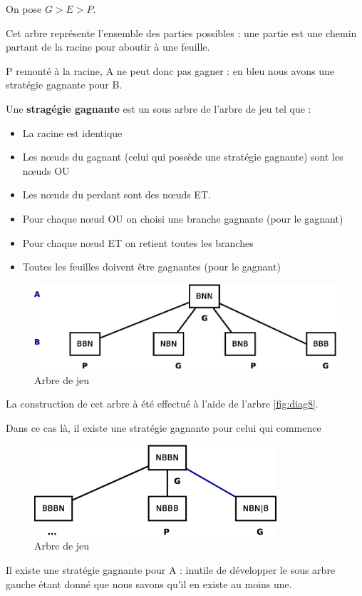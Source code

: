 \documentclass[12pt,a4paper,openany]{book}
\begin{document}
	On pose $G > E > P$.

	Cet arbre représente l'ensemble des parties possibles :
	une partie est une chemin partant de la racine pour
	aboutir à une feuille.

	P remonté à la racine, A ne peut donc pas gagner : en bleu nous avons une stratégie gagnante pour B.

	\begin{definition}
		Une \textbf{stragégie gagnante} est un sous arbre de
		l'arbre de jeu tel que : 
		\begin{itemize}
			\item La racine est identique
			\item Les n\oe{}uds du gagnant (celui qui possède
				une stratégie gagnante) sont les
				n\oe{}uds OU
			\item Les nœuds du perdant sont des nœuds ET.
			\item Pour chaque nœud OU on choisi une branche
				gagnante (pour le gagnant)
			\item Pour chaque nœud ET on retient toutes les
				branches
			\item Toutes les feuilles doivent être gagnantes
				(pour le gagnant)
		\end{itemize}
	\end{definition}
	\begin{figure}[H]
		\centering
		\includegraphics[width=12cm]{Diagramme9.eps}
		\caption{Arbre de jeu}
	\end{figure}
\begin{remarque}
	La construction de cet arbre à été effectué à l'aide de
	l'arbre \ref{fig:diag8}.
\end{remarque}
	Dans ce cas là, il existe une stratégie gagnante pour celui  
	qui commence

	\begin{figure}[H]
		\centering
		\includegraphics[width=9cm]{Diagramme10.eps}
		\caption{Arbre de jeu}
	\end{figure}
	Il existe une stratégie gagnante pour A : inutile de
	développer le sous arbre gauche étant donné que nous
	savons qu'il en existe au moins une. 
\end{document}
